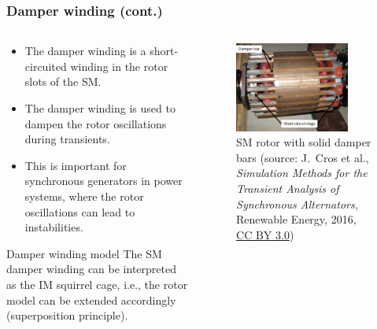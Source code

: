 \begin{frame}
	\frametitle{Damper winding (cont.)}	
    \begin{columns}
		\begin{column}{0.5\textwidth}
			\begin{itemize}
				\item<1-> The damper winding is a short-circuited winding in the rotor slots of the SM.
				\item<2-> The damper winding is used to dampen the rotor oscillations during transients.
				\item<3-> This is important for synchronous generators in power systems, where the rotor oscillations can lead to instabilities.
			\end{itemize}
			\begin{varblock}
				{Damper winding model}
					The SM damper winding can be interpreted as the IM squirrel cage, i.e., the rotor model can be extended accordingly (superposition principle). 
			\end{varblock}
		\end{column}
        \begin{column}{0.5\textwidth}
			\onslide<1->
            \begin{figure}
                \centering
                \includegraphics[width=0.825\textwidth]{fig/lec07/Salient_pole_damper_winding_02.png}
                \caption{SM rotor with solid damper bars (source: J.~Cros et al., \textit{Simulation Methods for the Transient Analysis of Synchronous Alternators}, Renewable Energy, 2016, \href{https://creativecommons.org/licenses/by/3.0/}{CC BY 3.0})}
                \label{fig:Salient_pole_damper_winding_02}
            \end{figure}
        \end{column}
    \end{columns}
\end{frame}

